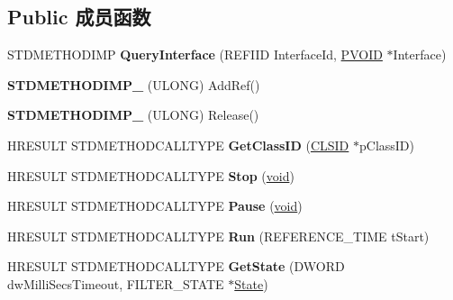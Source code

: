 \subsection*{Public 成员函数}
\begin{DoxyCompactItemize}
\item 
\mbox{\label{class_c_ks_proxy_a66ab75e4bacdb29b7ac7f05edc260989}} 
S\+T\+D\+M\+E\+T\+H\+O\+D\+I\+MP {\bfseries Query\+Interface} (R\+E\+F\+I\+ID Interface\+Id, \hyperlink{interfacevoid}{P\+V\+O\+ID} $\ast$Interface)
\item 
\mbox{\label{class_c_ks_proxy_a58c9e60986675a1e387b1e12eaffc738}} 
{\bfseries S\+T\+D\+M\+E\+T\+H\+O\+D\+I\+M\+P\+\_\+} (U\+L\+O\+NG) Add\+Ref()
\item 
\mbox{\label{class_c_ks_proxy_afa2adfb06deed773140d43258f828b2e}} 
{\bfseries S\+T\+D\+M\+E\+T\+H\+O\+D\+I\+M\+P\+\_\+} (U\+L\+O\+NG) Release()
\item 
\mbox{\label{class_c_ks_proxy_abcd9c6e679992cfa213ea9fd5f3799d7}} 
H\+R\+E\+S\+U\+LT S\+T\+D\+M\+E\+T\+H\+O\+D\+C\+A\+L\+L\+T\+Y\+PE {\bfseries Get\+Class\+ID} (\hyperlink{struct___i_i_d}{C\+L\+S\+ID} $\ast$p\+Class\+ID)
\item 
\mbox{\label{class_c_ks_proxy_a370f1a3647354ce09fcba35fed2e879f}} 
H\+R\+E\+S\+U\+LT S\+T\+D\+M\+E\+T\+H\+O\+D\+C\+A\+L\+L\+T\+Y\+PE {\bfseries Stop} (\hyperlink{interfacevoid}{void})
\item 
\mbox{\label{class_c_ks_proxy_a8e91a3bb88ac38f3b23e47e0be53bd6b}} 
H\+R\+E\+S\+U\+LT S\+T\+D\+M\+E\+T\+H\+O\+D\+C\+A\+L\+L\+T\+Y\+PE {\bfseries Pause} (\hyperlink{interfacevoid}{void})
\item 
\mbox{\label{class_c_ks_proxy_ab19da6e02e18d28e6417640e714f35f9}} 
H\+R\+E\+S\+U\+LT S\+T\+D\+M\+E\+T\+H\+O\+D\+C\+A\+L\+L\+T\+Y\+PE {\bfseries Run} (R\+E\+F\+E\+R\+E\+N\+C\+E\+\_\+\+T\+I\+ME t\+Start)
\item 
\mbox{\label{class_c_ks_proxy_af7c8872168b35d3f2e22db9a7f29058e}} 
H\+R\+E\+S\+U\+LT S\+T\+D\+M\+E\+T\+H\+O\+D\+C\+A\+L\+L\+T\+Y\+PE {\bfseries Get\+State} (D\+W\+O\+RD dw\+Milli\+Secs\+Timeout, F\+I\+L\+T\+E\+R\+\_\+\+S\+T\+A\+TE $\ast$\hyperlink{struct_state}{State})

\end{DoxyCompactItemize}
